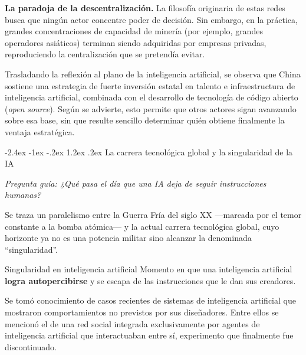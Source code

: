 \documentclass[12pt,oneside]{book}
\makeatletter
\renewcommand\section{\@startsection{section}{1}{\z@}%
  {-2.4ex \@plus -1ex \@minus -.2ex}%
  {1.2ex \@plus .2ex}%
  {\normalfont\Large\bfseries\color{blue!50!black}}}
\newcommand{\guia}[1]{\noindent\textit{Pregunta guía: #1}\par\smallskip}
\makeatother
\begin{document}
\begin{important}
\textbf{La paradoja de la descentralización.} La filosofía originaria de estas redes busca que ningún actor concentre poder de decisión. Sin embargo, en la práctica, grandes concentraciones de capacidad de minería (por ejemplo, grandes operadores asiáticos) terminan siendo adquiridas por empresas privadas, reproduciendo la centralización que se pretendía evitar.
\end{important}

Trasladando la reflexión al plano de la inteligencia artificial, se observa que China sostiene una estrategia de fuerte inversión estatal en talento e infraestructura de inteligencia artificial, combinada con el desarrollo de tecnología de código abierto (\textit{open source}). Según se advierte, esto permite que otros actores sigan avanzando sobre esa base, sin que resulte sencillo determinar quién obtiene finalmente la ventaja estratégica.

\section{La carrera tecnológica global y la singularidad de la IA}

\guia{¿Qué pasa el día que una IA deja de seguir instrucciones humanas?}

Se traza un paralelismo entre la Guerra Fría del siglo XX ---marcada por el temor constante a la bomba atómica--- y la actual carrera tecnológica global, cuyo horizonte ya no es una potencia militar sino alcanzar la denominada ``singularidad''.

\begin{definition}{Singularidad en inteligencia artificial}
Momento en que una inteligencia artificial \textbf{logra autopercibirse} y se escapa de las instrucciones que le dan sus creadores.
\end{definition}

Se tomó conocimiento de casos recientes de sistemas de inteligencia artificial que mostraron comportamientos no previstos por sus diseñadores. Entre ellos se mencionó el de una red social integrada exclusivamente por agentes de inteligencia artificial que interactuaban entre sí, experimento que finalmente fue discontinuado.
\end{document}
